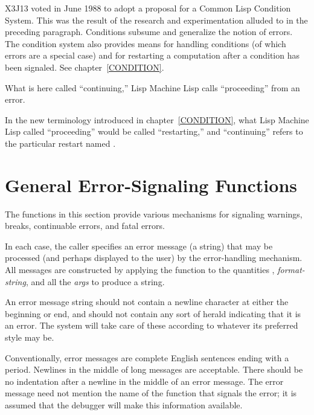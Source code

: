 \begin{newer}
X3J13 voted in June 1988
to adopt a proposal for a Common Lisp Condition System.
This was the result of the research and experimentation
alluded to in the preceding paragraph.
Conditions subsume and generalize the notion of errors.
The condition system also provides means for handling
conditions (of which errors are a special case) and
for restarting a computation after a condition has been signaled.
See chapter~\ref{CONDITION}.
\end{newer}

\beforenoterule
\begin{incompatibility}
What is here called ``continuing,''
Lisp Machine Lisp calls ``proceeding'' from an error.
\begin{new}
In the new terminology introduced in chapter~\ref{CONDITION},
what Lisp Machine Lisp called ``proceeding'' would be called
``restarting,'' and ``continuing'' refers to the particular
restart named .
\end{new}
\end{incompatibility}
\afternoterule

\section{General Error-Signaling Functions}
\label{ERROR-SIGNALLING-FUNCTIONS}

The functions in this section provide various mechanisms
for signaling warnings, breaks, continuable errors, and fatal errors.

In each case, the caller specifies an error message (a string) that may be
processed (and perhaps displayed to the user) by the error-handling
mechanism.  All messages are
constructed by applying the function
 to the quantities {\nil}, {\it format-string},
and all the {\it args} to produce a string.

An error message string should not contain a newline character
at either the beginning or end, and should not contain any sort of
herald indicating that it is an error.  The system will take care of
these according to whatever its preferred style may be.  

Conventionally,
error messages are complete English sentences ending with a period.
Newlines in the middle of long messages are acceptable.  There
should be no indentation after a newline in the middle of an
error message.  The error message need not mention the name of the function
that signals the error; it is assumed that the debugger will make this
information available.

